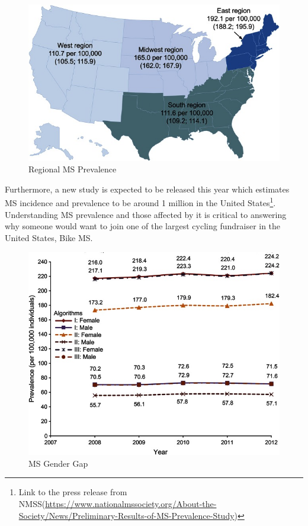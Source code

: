 \documentclass[]{article}
\let\rmarkdownfootnote\footnote%
\def\footnote{\protect\rmarkdownfootnote}
\begin{document}
\begin{figure}
\centering
\includegraphics{RegionalMSprev.jpg}
\caption{Regional MS Prevalence}
\end{figure}

Furthermore, a new study is expected to be released this year which
estimates MS incidence and prevalence to be around 1 million in the
United States\footnote{Link to the press release from
  NMSS(\url{https://www.nationalmssociety.org/About-the-Society/News/Preliminary-Results-of-MS-Prevalence-Study})}.
Understanding MS prevalence and those affected by it is critical to
answering why someone would want to join one of the largest cycling
fundraiser in the United States, Bike MS.

\begin{figure}
\centering
\includegraphics{MSgenderGap.jpg}
\caption{MS Gender Gap}
\end{figure}
\end{document}

